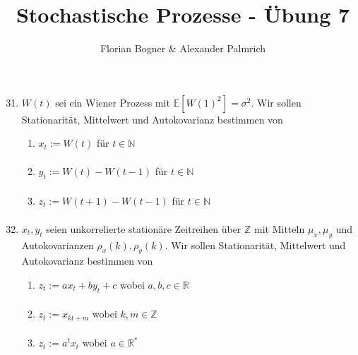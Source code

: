 \documentclass[a4paper,11pt,notitlepage,fullpage]{article}
\newcommand{\Ee}[1]{\mathbb E\left[#1\right]}
\begin{document}
\author{Florian Bogner \& Alexander Palmrich}
\title{Stochastische Prozesse - Übung 7}
\maketitle

\begin{enumerate}
\setcounter{enumi}{30}


\item $W(t)$ sei ein Wiener Prozess mit $\Ee{W(1)^2}=\sigma^2$. Wir sollen Stationarität, Mittelwert und Autokovarianz bestimmen von
\begin{enumerate}
\item $x_t := W(t)$ für $t\in \mathbb{N}$
\begin{align*}
\end{align*}

\item $y_t := W(t)-W(t-1)$ für $t\in \mathbb{N}$
\begin{align*}
\end{align*}

\item $z_t := W(t+1)-W(t-1)$ für $t\in \mathbb{N}$
\begin{align*}
\end{align*}
\end{enumerate}


\item $x_t, y_t$ seien unkorrelierte stationäre Zeitreihen über $\mathbb{Z}$ mit Mitteln $\mu_x, \mu_y$ und Autokovarianzen $\rho_x(k), \rho_y(k)$. Wir sollen Stationarität, Mittelwert und Autokovarianz bestimmen von
\begin{enumerate}
\item $z_t := ax_t + by_t + c$ wobei $a,b,c \in \mathbb{R}$
\begin{align*}
\end{align*}

\item $z_t := x_{kt+m}$ wobei $k,m \in \mathbb{Z}$
\begin{align*}
\end{align*}

\item $z_t := a^tx_t$ wobei $a \in \mathbb{R}^*$
\begin{align*}
\end{align*}


\end{enumerate}
\end{enumerate}
\end{document}
